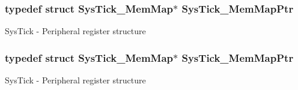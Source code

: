 \subsubsection[{\texorpdfstring{Sys\+Tick\+\_\+\+Mem\+Map\+Ptr}{SysTick_MemMapPtr}}]{\setlength{\rightskip}{0pt plus 5cm}typedef struct {\bf Sys\+Tick\+\_\+\+Mem\+Map}$\ast$ {\bf Sys\+Tick\+\_\+\+Mem\+Map\+Ptr}}\hypertarget{group___sys_tick___peripheral_ga19e2a0c9400dcdfd462a92ca83cff253}{}\label{group___sys_tick___peripheral_ga19e2a0c9400dcdfd462a92ca83cff253}
Sys\+Tick -\/ Peripheral register structure 
\subsubsection[{\texorpdfstring{Sys\+Tick\+\_\+\+Mem\+Map\+Ptr}{SysTick_MemMapPtr}}]{\setlength{\rightskip}{0pt plus 5cm}typedef struct {\bf Sys\+Tick\+\_\+\+Mem\+Map}$\ast$ {\bf Sys\+Tick\+\_\+\+Mem\+Map\+Ptr}}\hypertarget{group___sys_tick___peripheral_ga19e2a0c9400dcdfd462a92ca83cff253}{}\label{group___sys_tick___peripheral_ga19e2a0c9400dcdfd462a92ca83cff253}
Sys\+Tick -\/ Peripheral register structure 